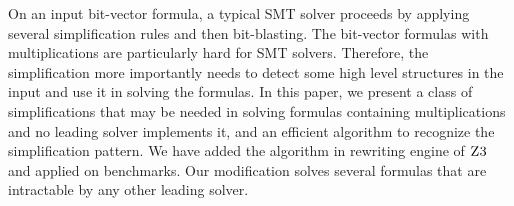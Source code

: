 %
On an input bit-vector formula,
a typical SMT solver proceeds by applying several
simplification rules and then bit-blasting.
%
The bit-vector formulas with multiplications
are particularly hard for SMT solvers.
%
Therefore, the simplification more importantly needs
to detect some high level structures
in the input and use it in solving the formulas.
%
In this paper, we present a class of simplifications
that may be needed in solving formulas containing
multiplications and no leading solver implements it, and
an efficient algorithm to recognize the simplification
pattern. 
%
We have added the algorithm in rewriting engine of $\textsc{Z3}$
and applied on benchmarks.
%
Our modification solves several formulas that are
intractable by any other leading solver.
%


